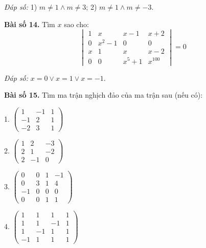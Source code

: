         \textit{Đáp số:} 1) \(m \neq 1 \land m \neq 3\); 2) \(m \neq 1 \land m \neq -3\).
        
        \textbf{Bài số 14.} Tìm \(x\) sao cho:
        \[
        \begin{vmatrix}
        1 & x & x - 1 & x + 2 \\
        0 & x^2 - 1 & 0 & 0 \\
        x & 1 & x & x - 2 \\
        0 & 0 & x^5 + 1 & x^{100}
        \end{vmatrix} = 0
        \]
        
        \textit{Đáp số:} \(x = 0 \lor x = 1 \lor x = -1\).
        
        \textbf{Bài số 15.} Tìm ma trận nghịch đảo của ma trận sau (nếu có):
        
        1.
        \(
        \begin{pmatrix}
        1 & -1 & 1 \\
        -1 & 2 & 1 \\
        -2 & 3 & 1
        \end{pmatrix}
        \)
        \vspace*{0.5cm}

        2.
        \(
        \begin{pmatrix}
        1 & 2 & -3 \\
        2 & 1 & -2 \\
        2 & -1 & 0
        \end{pmatrix}
        \)
        \vspace*{0.5cm}

        3.
        \(
        \begin{pmatrix}
        0 & 0 & 1 & -1 \\
        0 & 3 & 1 & 4 \\
        -1 & 0 & 0 & 0 \\
        0 & 0 & 1 & 1
        \end{pmatrix}
        \)
        \vspace*{0.5cm}

        4.
        \(
        \begin{pmatrix}
        1 & 1 & 1 & 1 \\
        1 & 1 & -1 & 1 \\
        1 & -1 & 1 & 1 \\
        -1 & 1 & 1 & 1
        \end{pmatrix}
        \)
        \vspace*{0.5cm}

